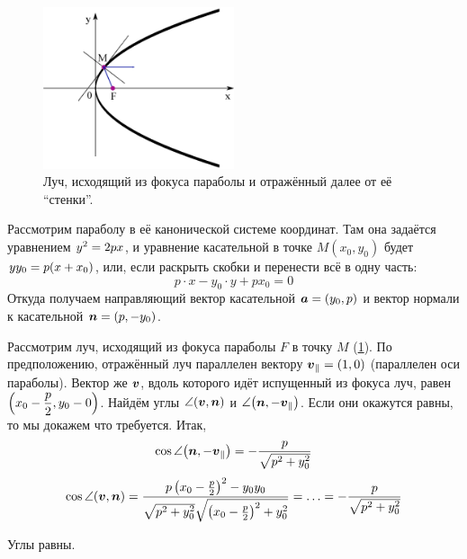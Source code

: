 \documentclass[a4paper,12pt]{article}
\begin{document}
  \begin{solution}
    \begin{figure}[h]
      \centering

      \includegraphics[width=0.5\textwidth]{parabola-8-29}
    
      \caption{Луч, исходящий из фокуса параболы и отражённый далее от её ``стенки''.}
      \label{fig:parabola-8-29}
    \end{figure}
    
    Рассмотрим параболу в её канонической системе координат.
    Там она задаётся уравнением
    $
      y^2 \hm= 2px
    $,
    и уравнение касательной в точке $M(x_0, y_0)$ будет
    $
      y y_0 \hm= p(x \hm+ x_0)
    $,
    или, если раскрыть скобки и перенести всё в одну часть:
    \[
      p \cdot x - y_0 \cdot y + px_0 = 0
    \]
    Откуда получаем направляющий вектор касательной $\bds a \hm= (y_0, p)$ и вектор нормали к касательной
    $
      \bds n \hm= (p, -y_0)
    $.
    
    Рассмотрим луч, исходящий из фокуса параболы $F$ в точку $M$ (\ref{fig:parabola-8-29}).
    По предположению, отражённый луч параллелен вектору $\bds v_{\parallel} \hm= (1, 0)$ (параллелен оси параболы).
    Вектор же $\boldsymbol v$, вдоль которого идёт испущенный из фокуса луч, равен $\left(x_0 \hm- \dfrac{p}{2}, y_0 \hm- 0\right)$.
    Найдём углы $\angle{(\boldsymbol v, \boldsymbol n)}$ и $\angle{\left(\boldsymbol n, -\boldsymbol v_{\parallel}\right)}$.
    Если они окажутся равны, то мы докажем что требуется.
    Итак,
    \[
      \cos \angle{\left(\boldsymbol n, -\boldsymbol v_{\parallel}\right)} = -\frac{p}{\sqrt{p^2 + y_0^2}}
    \]
    \[
      \cos \angle{(\boldsymbol v, \boldsymbol n)} = \frac{p \left(x_0 - \frac{p}{2}\right)^2 - y_0 y_0}{\sqrt{p^2 + y_0^2} \sqrt{\left(x_0 - \frac{p}{2}\right)^2 + y_0^2}} = \ldots = -\frac{p}{\sqrt{p^2 + y_0^2}}
    \]
    
    Углы равны.
  \end{solution}
\end{document}
